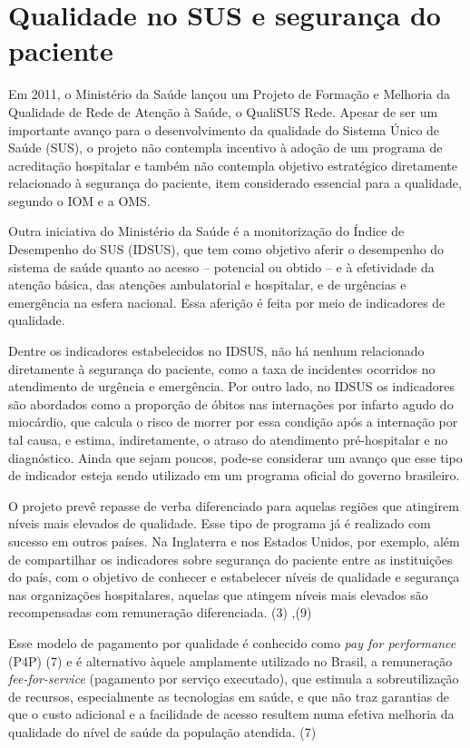 \documentclass{article}
\begin{document}
\section{Qualidade no SUS e segurança do paciente}

Em 2011, o Ministério da Saúde lançou um Projeto de Formação e Melhoria da
Qualidade de
Rede de Atenção à Saúde, o QualiSUS Rede.
Apesar de ser um importante avanço para o desenvolvimento da qualidade do
Sistema
Único de Saúde (SUS), o projeto não contempla incentivo à adoção de um programa
de
acreditação hospitalar e também não contempla objetivo estratégico diretamente
relacionado à
segurança do paciente, item considerado essencial para a qualidade, segundo o
IOM e a
OMS.

Outra iniciativa do Ministério da Saúde é a monitorização do Índice de
Desempenho do SUS
(IDSUS), que tem como objetivo aferir o desempenho do sistema de saúde quanto ao
acesso –
potencial ou obtido – e à efetividade da atenção básica, das atenções
ambulatorial e
hospitalar, e de urgências e emergência na esfera nacional.
Essa aferição é feita por meio de indicadores de qualidade.

Dentre os indicadores estabelecidos no IDSUS, não há nenhum relacionado
diretamente à
segurança do paciente, como a taxa de incidentes ocorridos no atendimento de
urgência e
emergência. Por outro lado, no IDSUS os indicadores são abordados como a
proporção de óbitos
nas internações por infarto agudo do miocárdio, que calcula o risco de morrer
por essa
condição após a internação por tal causa, e estima, indiretamente, o atraso do
atendimento
pré-hospitalar e no diagnóstico.
Ainda que sejam poucos, pode-se considerar um avanço que esse tipo de indicador
esteja sendo utilizado em um programa oficial do governo brasileiro.

O projeto prevê repasse de verba diferenciado para aquelas regiões que atingirem
níveis
mais elevados de qualidade. Esse tipo de programa já é realizado com sucesso em
outros
países. Na Inglaterra e nos Estados Unidos, por exemplo, além de compartilhar os
indicadores
sobre segurança do paciente entre as instituições do país, com o objetivo de
conhecer e
estabelecer níveis de qualidade e segurança nas organizações hospitalares,
aquelas que
atingem níveis mais elevados são recompensadas com remuneração diferenciada. (3)
,(9)

Esse modelo de pagamento por qualidade é conhecido como \textit{pay for
performance}
(P4P) (7)
e é alternativo àquele amplamente utilizado no Brasil, a remuneração
\textit{fee-for-service}
(pagamento por serviço executado), que estimula a
sobreutilização de recursos, especialmente as tecnologias em saúde, e que não
traz garantias
de que o custo adicional e a facilidade de acesso resultem numa efetiva melhoria
da
qualidade do nível de saúde da população atendida. (7)
\end{document}
